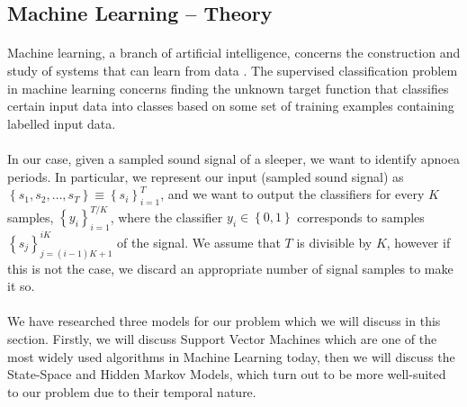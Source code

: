 \subsection{Machine Learning -- Theory}

\paragraph{}
	Machine learning, a branch of artificial intelligence, concerns the construction and study of systems that can learn from data \cite{wiki:machineLearning}. The supervised classification problem in machine learning concerns finding the unknown target function that classifies certain input data into classes based on some set of training examples containing labelled input data.
	
\paragraph{}
	In our case, given a sampled sound signal of a sleeper, we want to identify apnoea periods. In particular, we represent our input (sampled sound signal) as $\left\{s_1, s_2, \dotsc, s_T \right\} \equiv \left\{ s_i \right\}_{i = 1}^{T}$, and we want to output the classifiers for every $K$ samples, $\left\{ y_i \right\}_{i = 1}^{T/K}$, where the classifier $y_i \in \left\{0, 1\right\}$ corresponds to samples $\left\{ s_j \right\}_{j = \left(i - 1\right)K + 1}^{iK}$ of the signal. We assume that $T$ is divisible by $K$, however if this is not the case, we discard an appropriate number of signal samples to make it so.
	
\paragraph{}
	We have researched three models for our problem which we will discuss in this section. Firstly, we will discuss Support Vector Machines which are one of the most widely used algorithms in Machine Learning today, then we will discuss the State-Space and Hidden Markov Models, which turn out to be more well-suited to our problem due to their temporal nature.
	



